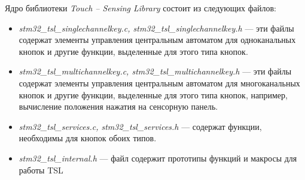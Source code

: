 Ядро библиотеки \textit{Touch --  Sensing Library} состоит из следующих файлов:
\begin{itemize}
\item \textit{stm32\_tsl\_singlechannelkey.c, stm32\_tsl\_singlechannelkey.h} --- эти файлы содержат элементы управления центральным автоматом для одноканальных кнопок и другие функции, выделенные для этого типа кнопок.
\item \textit{stm32\_tsl\_multichannelkey.c, stm32\_tsl\_multichannelkey.h} --- эти файлы содержат элементы управления центральным автоматом для многоканальных кнопок и другие функции, выделенные для этого типа кнопок, например, вычисление положения нажатия на сенсорную панель.

\item \textit{stm32\_tsl\_services.c, stm32\_tsl\_services.h} --- содержат функции, необходимы для кнопок обоих типов.

\item \textit{stm32\_tsl\_internal.h} --- файл содержит прототипы функций и макросы для работы TSL
\end{itemize}

